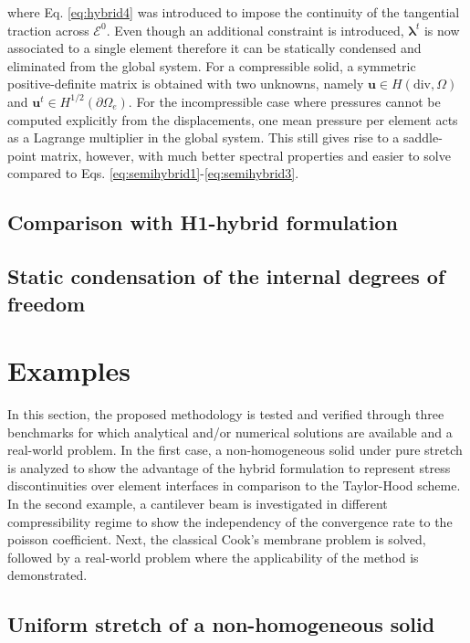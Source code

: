 \documentclass[english,11pt,3p,number,sort&compress]{elsarticle}
\begin{document}
\noindent where Eq. \eqref{eq:hybrid4} was introduced to impose the continuity of the tangential traction across $\mathcal{E}^0$. Even though an additional constraint is introduced, $\boldsymbol{\lambda}^t$ is now associated to a single element therefore it can be statically condensed and eliminated from the global system. For a compressible solid, a symmetric positive-definite matrix is obtained with two unknowns, namely $\mathbf{u} \in H(\text{div},\Omega)$ and $\mathbf{u}^t \in H^{1/2}(\partial\Omega_e)$. For the incompressible case where pressures cannot be computed explicitly from the displacements, one mean pressure per element acts as a Lagrange multiplier in the global system. This still gives rise to a saddle-point matrix, however, with much better spectral properties and easier to solve compared to Eqs. \eqref{eq:semihybrid1}-\eqref{eq:semihybrid3}.

\subsection{Comparison with H1-hybrid formulation}

\lipsum[1-1]

\subsection{Static condensation of the internal degrees of freedom}

\lipsum[1-1]

\section{Examples \label{sec:Examples}}

In this section, the proposed methodology is tested and verified through three benchmarks for which analytical and/or numerical solutions are available and a real-world problem. In the first case, a non-homogeneous solid under pure stretch is analyzed to show the advantage of the hybrid formulation to represent stress discontinuities over element interfaces in comparison to the Taylor-Hood scheme. In the second example, a cantilever beam is investigated in different compressibility regime to show the independency of the convergence rate to the poisson coefficient. Next, the classical Cook's membrane problem is solved, followed by a real-world problem where the applicability of the method is demonstrated.

\subsection{Uniform stretch of a non-homogeneous solid \label{subsec:non-homogeneous}}
\end{document}
